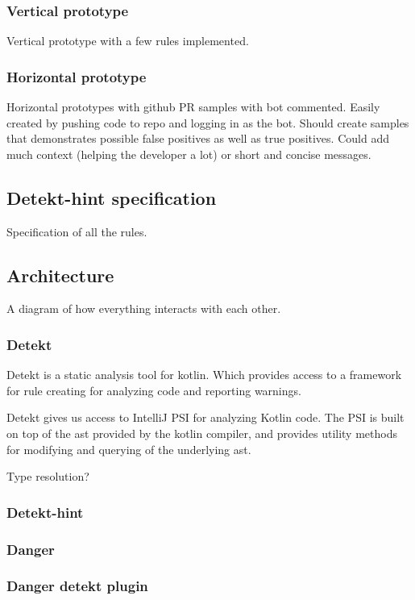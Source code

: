 \documentclass{article}
\begin{document}
\subsubsection{Vertical prototype}
Vertical prototype with a few rules implemented.


\subsubsection{Horizontal prototype}
Horizontal prototypes with github PR samples with bot commented. Easily created by pushing code to repo and logging in as the bot. Should create samples that demonstrates possible false positives as well as true positives. Could add much context (helping the developer a lot) or short and concise messages.


\subsection{Detekt-hint specification}
Specification of all the rules.

\subsection{Architecture}
A diagram of how everything interacts with each other.

\subsubsection{Detekt}
Detekt is a static analysis tool for kotlin. Which provides access to a framework for rule creating for analyzing code and reporting warnings.

Detekt gives us access to IntelliJ PSI for analyzing Kotlin code. The PSI is built on top of the \gls{ast} provided by the kotlin compiler, and provides utility methods for modifying and querying of the underlying \gls{ast}.

Type resolution?

\subsubsection{Detekt-hint}

\subsubsection{Danger}

\subsubsection{Danger detekt plugin}
\end{document}
